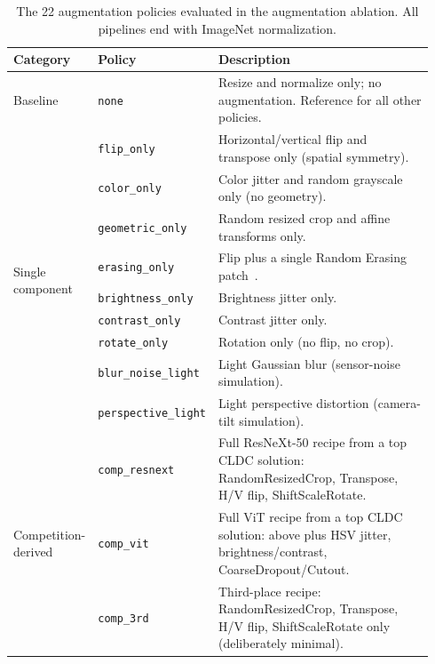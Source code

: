 \documentclass[conference]{IEEEtran}
\begin{document}
\begin{table}[t]
\centering
\caption{The 22 augmentation policies evaluated in the augmentation ablation. All pipelines end with ImageNet normalization.}
\label{tab:aug_modes}
\renewcommand{\arraystretch}{1.15}
\begin{tabular}{p{0.16\linewidth}p{0.19\linewidth}p{0.59\linewidth}}
\toprule
\textbf{Category} & \textbf{Policy} & \textbf{Description} \\
\midrule
Baseline                       & \texttt{none}                 & Resize and normalize only; no augmentation. Reference for all other policies. \\
\midrule
\multirow{9}{*}{Single component}
                               & \texttt{flip\_only}           & Horizontal/vertical flip and transpose only (spatial symmetry). \\
                               & \texttt{color\_only}          & Color jitter and random grayscale only (no geometry). \\
                               & \texttt{geometric\_only}      & Random resized crop and affine transforms only. \\
                               & \texttt{erasing\_only}        & Flip plus a single Random Erasing patch~\cite{zhong2020randomerasing}. \\
                               & \texttt{brightness\_only}     & Brightness jitter only. \\
                               & \texttt{contrast\_only}       & Contrast jitter only. \\
                               & \texttt{rotate\_only}         & Rotation only (no flip, no crop). \\
                               & \texttt{blur\_noise\_light}   & Light Gaussian blur (sensor-noise simulation). \\
                               & \texttt{perspective\_light}   & Light perspective distortion (camera-tilt simulation). \\
\midrule
\multirow{3}{*}{Competition-derived}
                               & \texttt{comp\_resnext}        & Full ResNeXt-50 recipe from a top CLDC solution: RandomResizedCrop, Transpose, H/V flip, ShiftScaleRotate. \\
                               & \texttt{comp\_vit}            & Full ViT recipe from a top CLDC solution: above plus HSV jitter, brightness/contrast, CoarseDropout/Cutout. \\
                               & \texttt{comp\_3rd}            & Third-place recipe: RandomResizedCrop, Transpose, H/V flip, ShiftScaleRotate only (deliberately minimal). \\

\end{tabular}
\end{table}
\end{document}
